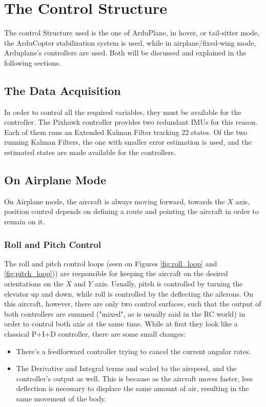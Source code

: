\chapter{The Control Structure} \label{chap:control}

The control Structure used is the one of ArduPlane, in hover, or tail-sitter mode, the ArduCopter stabilization system is used, while in airplane/fixed-wing mode, Arduplane's controllers are used. Both will be discussed and explained in the following sections.

\section{The Data Acquisition}

In order to control all the required variables, they must be available for the controller. The Pixhawk controller provides two redundant IMUs for this reason. Each of them runs an Extended Kalman Filter tracking 22 states\cite{kalman}\cite{kalmanArducopter}. Of the two running Kalman Filters, the one with smaller error estimation is used, and the estimated states are made available for the controllers.

\section{On Airplane Mode}

On Airplane mode, the aircraft is always moving forward, towards the $X$ axis, position control depends on defining a route and pointing the aircraft in order to remain on it.

\subsection{Roll and Pitch Control}

The roll and pitch control loops (seen on Figures \ref{fig:roll_loop} and \ref{fig:pitch_loop})) are responsible for keeping the aircraft on the desired orientations on the $X$ and $Y$ axis. Usually, pitch is controlled by turning the elevator up and down, while roll is controlled by the deflecting the ailerons. On this aircraft, however, there are only two control surfaces, such that the output of both controllers are summed ("mixed", as is usually said in the RC world) in order to control both axis at the same time.
While at first they look like a classical P+I+D controller, there are some small changes:

\begin{itemize}
\item There's a feedforward controller trying to cancel the current angular rates.
\item The Derivative and Integral terms and scaled to the airspeed, and the controller's output as well. This is because  as the aircraft moves faster, less deflection is necessary to displace the same amount of air, resulting in the same movement of the body.
\end{itemize}


